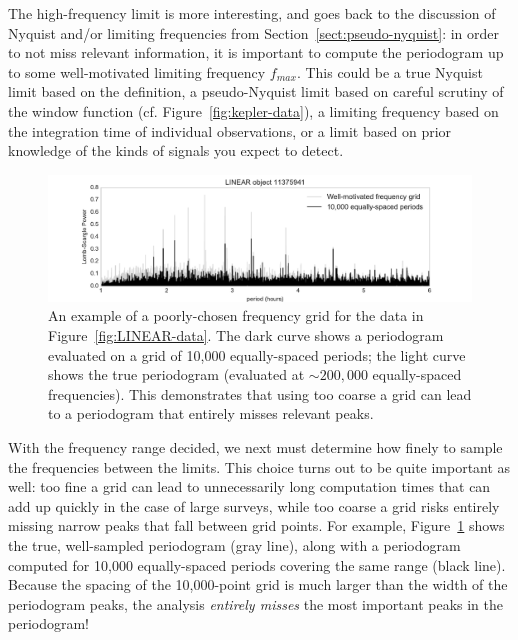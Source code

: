 \documentclass[preprint]{aastex}
\newcommand{\fig}[1]{Figure~\ref{fig:#1}}
\newcommand{\figlabel}[1]{\label{fig:#1}}
\newcommand{\Sect}[1]{Section~\ref{sect:#1}}
\newcommand{\sect}[1]{\Sect{#1}}
\begin{document}
The high-frequency limit is more interesting, and goes back to the discussion
of Nyquist and/or limiting frequencies from \sect{pseudo-nyquist}:
in order to not miss relevant information, it is important to compute the
periodogram up to some well-motivated limiting frequency $f_{max}$. This could
be a true Nyquist limit based on the \citet{Eyer99} definition, a pseudo-Nyquist
limit based on careful scrutiny of the window function (cf. \fig{kepler-data}),
a limiting frequency based on the integration time of individual
observations, or a limit based on prior knowledge of the kinds of signals
you expect to detect.

\begin{figure}[ht]
  \centering
  \includegraphics[width=\textwidth]{fig19_LINEAR_coarse_grid}
  \caption{An example of a poorly-chosen frequency grid for the data in
    \fig{LINEAR-data}. The dark curve shows a periodogram evaluated on a
    grid of 10,000 equally-spaced periods; the light curve shows the true
    periodogram (evaluated at ${\sim}200,000$ equally-spaced frequencies).
    This demonstrates that using too coarse a grid can lead to a periodogram
    that entirely misses relevant peaks.
    \figlabel{LINEAR-coarse-grid}}
\end{figure}

With the frequency range decided, we next must determine how finely to sample
the frequencies between the limits.
This choice turns out to be quite important as well: too fine a grid can
lead to unnecessarily long computation times that can add up quickly in the
case of large surveys, while too coarse a grid risks
entirely missing narrow peaks that fall between grid points.
For example, \fig{LINEAR-coarse-grid} shows the true, well-sampled periodogram
(gray line), along with a periodogram computed for 10,000 equally-spaced
periods covering the same range (black line).
Because the spacing of the 10,000-point grid is much larger than the width of
the periodogram peaks, the analysis {\it entirely misses} the most
important peaks in the periodogram!
\end{document}
